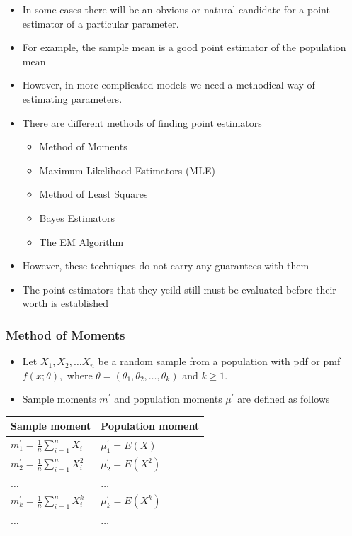 \documentclass[]{book}
\providecommand{\tightlist}{%
  \setlength{\itemsep}{0pt}\setlength{\parskip}{0pt}}
\begin{document}
\begin{itemize}
\tightlist
\item
  In some cases there will be an obvious or natural candidate for a point estimator of a particular parameter.
\item
  For example, the sample mean is a good point estimator of the population mean
\item
  However, in more complicated models we need a methodical way of estimating parameters.
\item
  There are different methods of finding point estimators

  \begin{itemize}
  \tightlist
  \item
    Method of Moments
  \item
    Maximum Likelihood Estimators (MLE)
  \item
    Method of Least Squares 
  \item
    Bayes Estimators
  \item
    The EM Algorithm
  \end{itemize}
\item
  However, these techniques do not carry any guarantees with them
\item
  The point estimators that they yeild still must be evaluated before their worth is established
\end{itemize}

\hypertarget{method-of-moments}{%
\subsubsection{Method of Moments}\label{method-of-moments}}

\begin{itemize}
\tightlist
\item
  Let \(X_1, X_2, \dots X_n\) be a random sample from a population with pdf or pmf \(f(x; \theta),\) where \(\theta = (\theta_1, \theta_2, \dots, \theta_k)\) and \(k\geq 1\).
\item
  Sample moments \(m^\prime\) and population moments \(\mu^\prime\) are defined as follows
\end{itemize}

\begin{longtable}[]{@{}ll@{}}
\toprule
Sample moment & Population moment\tabularnewline
\midrule
\endhead
\(m_1^\prime= \frac{1}{n}\sum_{i=1}^nX_i\) & \(\mu_1^\prime=E(X)\)\tabularnewline
\(m_2^\prime= \frac{1}{n}\sum_{i=1}^nX_i^2\) & \(\mu_2^\prime=E(X^2)\)\tabularnewline
\(\dots\) & \(\dots\)\tabularnewline
\(m_k^\prime= \frac{1}{n}\sum_{i=1}^nX_i^k\) & \(\mu_k^\prime=E(X^k)\)\tabularnewline
\(\dots\) & \(\dots\)\tabularnewline
\bottomrule
\end{longtable}
\end{document}
